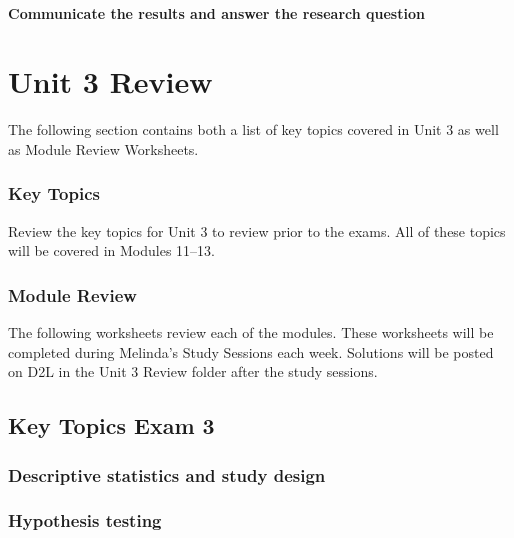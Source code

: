 \documentclass[
]{report}
\begin{document}
\subsubsection*{Communicate the results and answer the research question}\label{communicate-the-results-and-answer-the-research-question-6}

\chapter{Unit 3 Review}\label{unit-3-review}

The following section contains both a list of key topics covered in Unit 3 as well as Module Review Worksheets.

\subsection{Key Topics}\label{key-topics-13}

Review the key topics for Unit 3 to review prior to the exams. All of these topics will be covered in Modules 11--13.

\subsection{Module Review}\label{module-review-2}


The following worksheets review each of the modules. These worksheets will be completed during Melinda's Study Sessions each week. Solutions will be posted on D2L in the Unit 3 Review folder after the study sessions.

\newpage

\section{Key Topics Exam 3}\label{key-topics-exam-3}

\subsection*{Descriptive statistics and study design}\label{descriptive-statistics-and-study-design-2}

\subsection*{Hypothesis testing}\label{hypothesis-testing-7}
\end{document}
